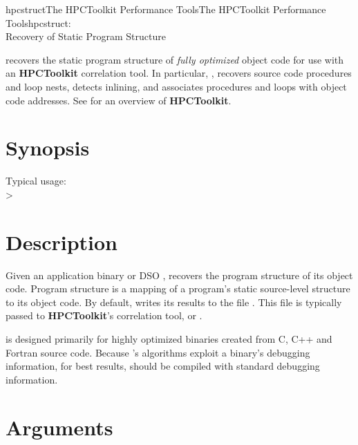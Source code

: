 \documentclass[english]{article}
\begin{document}
\begin{Name}{1}{hpcstruct}{The HPCToolkit Performance Tools}{The HPCToolkit Performance Tools}{hpcstruct:\\ Recovery of Static Program Structure}

 recovers the static program structure of \emph{fully optimized} object code for use with an \textbf{HPCToolkit} correlation tool.
In particular, , recovers source code procedures and loop nests, detects inlining, and associates procedures and loops with object code addresses.
See  for an overview of \textbf{HPCToolkit}.

\end{Name}

\section{Synopsis}

  

Typical usage:\\
  > 

\section{Description}

Given an application binary or DSO ,  recovers the program structure of its object code.
Program structure is a mapping of a program's static source-level structure to its object code.
By default,  writes its results to the file .
This file is typically passed to \textbf{HPCToolkit}'s correlation tool,  or .

 is designed primarily for highly optimized binaries created from C, C++ and Fortran source code.
Because 's algorithms exploit a binary's debugging information, for best results,  should be compiled with standard debugging information.

\section{Arguments}
\end{document}
